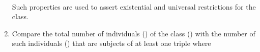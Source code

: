 \begin{enumerate}[leftmargin=0cm]
																																																																																																																																																																																																																																																																																																																																																																																																																																																																																																																																																									\\
																																																																																																																																																																																																																																																																																																																																																																																																																																																																																																																																																											Such properties are used to assert existential and universal restrictions for the class.
																																																																																																																																																																																																																																																																																																																																																																																																																																																																																																																																																												\item Compare the total number of individuals () of the class () with
																																																																																																																																																																																																																																																																																																																																																																																																																																																																																																																																																														the number of such individuals () that are subjects of at least one triple where 

\end{enumerate}
